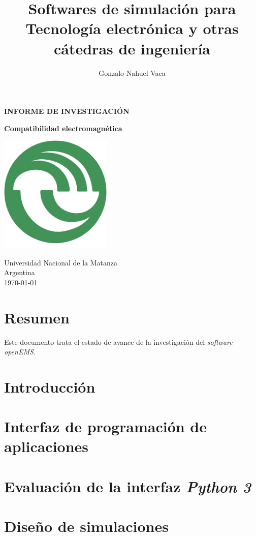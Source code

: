 \documentclass[
    11pt,
    spanish,
    a4paper
]{article}
\title{Softwares de simulación para Tecnología electrónica y otras cátedras de ingeniería}
\author{Gonzalo Nahuel Vaca}
\def\doctype{INFORME DE INVESTIGACIÓN}
\begin{document}
\makeatletter
\begin{titlepage}
	\begin{center}
		\vspace*{1cm}

		\Huge
		\textbf{\doctype}
		\vspace{0.5cm}

		\LARGE
		\@title
		\vspace{0.5cm}

		\textbf{Compatibilidad electromagnética}

		\vspace{1.5cm}

		\textbf{\@author}

		\vspace{1.5cm}

		\includegraphics[width=0.4\textwidth]{img/logoUNLaM.png}

		\vfill
		Universidad Nacional de la Matanza\\
		Argentina\\
		\today
	\end{center}
\end{titlepage}
\makeatother
\newpage

\section*{Resumen}

Este documento trata el estado de avance de la investigación del \emph{software} \emph{openEMS}.

\section*{Introducción}

\section*{Interfaz de programación de aplicaciones}

\section*{Evaluación de la interfaz \emph{Python 3}}

\section*{Diseño de simulaciones}
\end{document}
